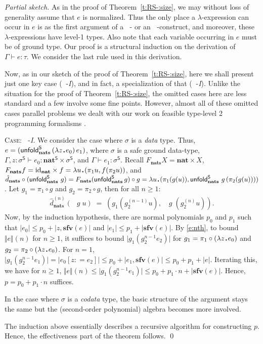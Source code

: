 \documentclass[envcountsame]{llncs}
\newcommand{\sfv}{\ensuremath{\mathbf{sfv}}}\newcommand{\ssize}[1]{\Vert #1\Vert}
\newcommand{\co}[1]{\hat{#1}}
\newcommand{\safe}[1]{#1^{\mathsf{S}}}
\newcommand{\folds}[1]{\mathop{\safe{\mathsf{fold}}_{#1}}}
\newcommand{\unfolds}[1]{\mathop{\safe{\mathsf{unfold}}_{#1}}}
\newcommand{\type}[1]{\ensuremath{\mathbf{#1}}\xspace}
\newcommand{\Nat}{\type{nat}}
\newcommand{\Nats}{\type{nats}}
\newcommand{\id}{\mathrm{id}}
\newcommand{\asize}[1]{\ensuremath{\mathopen{|}#1\mathclose{|}}\xspace}
\newcommand{\osize}[1]{\ensuremath{\mathopen{\Vert}#1\mathclose{\Vert}}}
\renewcommand{\gets}{\ensuremath{\mathrel{\colon=}}\xspace}
\newcommand{\entails}{\vdash}
\newcommand{\sqdot}{\rule{0.5mm}{0.5mm}}
\newcommand{\lam}[1]{\lambda #1\,\sqdot\,}
\newcommand{\of}{\colon}
\renewcommand{\colon}{\mathpunct{:}}
\begin{document}
\begin{proof}[Partial sketch]
As in the proof of Theorem~\ref{t:RS-:size}, we may without loss of
generality assume that $e$ is normalized.  Thus 
the only place a $\lambda$-expression can occur in $e$ is 
as the first argument of a $\folds{}$- or an $\unfolds{}$-construct, 
and moreover, these $\lambda$-expressions have level-1 types.
Also note that each variable occurring in $e$ must be of ground type. 
Our proof is a structural induction on the derivation of 
$\Gamma\entails e\of\tau$.  
We consider the last rule used in this derivation.


Now, as in our sketch of the proof of Theorem~\ref{t:RS-:size}, 
here we shall present just one key case ($\unfolds\tau$-\emph{I}), 
and in fact, a specialization of that ($\unfolds\Nats$-\emph{I}).
Unlike the situation for the proof of Theorem~\ref{t:RS-:size},
the omitted cases here are less standard and a few 
involve some fine points.  However, almost all of these omitted 
cases parallel problems we dealt with our work on feasible
type-level 2 programming formalisms 
\cite{DR:ATS:LMCS,DannerRoyer:2algs}.




\textsc{Case:} $\unfolds{\Nats}$-\emph{I}.
We consider the case where $\sigma$ is a \emph{data} type.
Thus, $e = (\unfolds{\Nats}\, (\lam{z}e_0) \, e_1)$, where 
$\sigma$ is a safe ground data-type,
$\Gamma,z\of\safe\sigma\entails e_0\of\safe\Nat\times \safe\sigma$, and $\Gamma\entails e_1\of{\safe\sigma}$.  
Recall 
$F_\Nats X = \Nat \times X$,
$F_\Nats f = \id_{\Nat}\times f
= \lam{u}(\pi_1 u,f(\pi_2 u))$, and
$\co{d}_\Nats\circ (\unfolds\Nats\,g) = 
F_\Nats (\unfolds{\Nats} g) \circ g =
\lam{u}(\pi_1(g(u)),\allowbreak \unfolds\Nats\, g\,(\pi_2(g(u))))$.
Let $g_1=\pi_1\circ g$ and $g_2=\pi_2\circ g$, then
for all $n\geq 1$:
\begin{gather}\label{e:nth}
  \co{d}_\Nats^{(n)}(\unfolds\Nats\,g\;u) \;=\; 
  \left(g_1(g_2^{(n-1)}u),\;
  \unfolds\Nats\, g\;(g_2^{(n)}u)\right).
\end{gather}
Now, by the induction hypothesis, there are normal polynomials
$p_0$ and $p_1$ such that
$\asize{e_0}\leq p_0+\asize{z,\sfv(e)}$ and
$\asize{e_1}\leq p_1+\asize{\sfv(e)}$.  
By \eqref{e:nth}, to bound $\osize{e}(n)$ for $n\geq 1$, 
it suffices to bound $\asize{g_1(g_2^{n-1} e_2)}$ for 
$g_1 = \pi_1\circ (\lam{z} e_0)$
and $g_2 = \pi_2 \circ (\lam{z} e_0)$.
For $n=1$, 
$\asize{g_1(g_2^{n-1} e_1)} = \asize{e_0[z\gets e_2]}
\leq p_0 + \asize{e_1,\sfv(e)} \leq p_0+p_1+\asize{e}$.
Iterating this, we have for $n\geq1$, 
$\osize{e}(n) \leq \asize{g_1(g_2^{n-1} e_1)} \leq p_0 
+ p_1\cdot n + \asize{\sfv(e)}$.
Hence, $p=p_0+p_1\cdot n$ suffices.


In the case where $\sigma$ is a \emph{codata} type, the basic 
structure of the argument stays the same but the (second-order
polynomial) algebra becomes more involved. 





The induction above essentially describes a recursive algorithm 
for constructing $p$.  Hence, the effectiveness part of the 
theorem follows. 
\qed
\end{proof}
\end{document}
